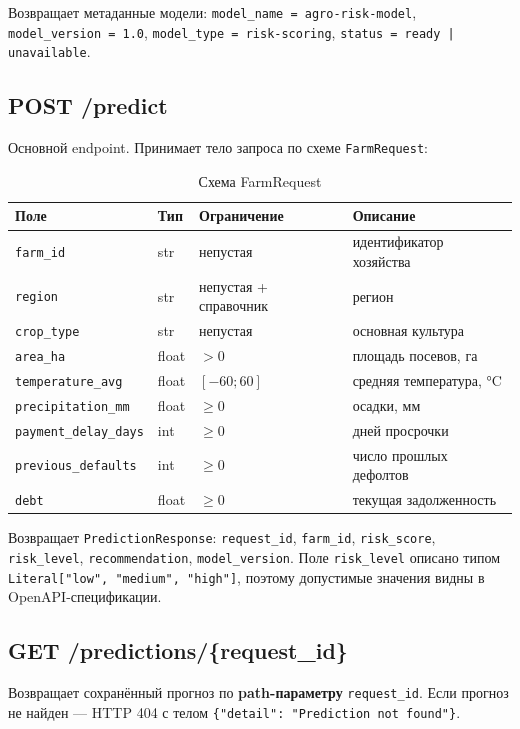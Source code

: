 \documentclass[12pt,a4paper]{article}
\begin{document}
Возвращает метаданные модели: \texttt{model\_name = agro-risk-model}, \texttt{model\_version = 1.0}, \texttt{model\_type = risk-scoring}, \texttt{status = ready | unavailable}.

\subsection{POST /predict}

Основной endpoint. Принимает тело запроса по схеме \texttt{FarmRequest}:

\begin{table}[H]
\centering
\caption{Схема FarmRequest}
\begin{tabular}{|l|l|l|l|}
\hline
\textbf{Поле} & \textbf{Тип} & \textbf{Ограничение} & \textbf{Описание} \\
\hline
\texttt{farm\_id} & str & непустая & идентификатор хозяйства \\
\texttt{region} & str & непустая + справочник & регион \\
\texttt{crop\_type} & str & непустая & основная культура \\
\texttt{area\_ha} & float & $> 0$ & площадь посевов, га \\
\texttt{temperature\_avg} & float & $[-60; 60]$ & средняя температура, °C \\
\texttt{precipitation\_mm} & float & $\ge 0$ & осадки, мм \\
\texttt{payment\_delay\_days} & int & $\ge 0$ & дней просрочки \\
\texttt{previous\_defaults} & int & $\ge 0$ & число прошлых дефолтов \\
\texttt{debt} & float & $\ge 0$ & текущая задолженность \\
\hline
\end{tabular}
\end{table}

Возвращает \texttt{PredictionResponse}: \texttt{request\_id}, \texttt{farm\_id}, \texttt{risk\_score}, \texttt{risk\_level}, \texttt{recommendation}, \texttt{model\_version}. Поле \texttt{risk\_level} описано типом \verb|Literal["low", "medium", "high"]|, поэтому допустимые значения видны в OpenAPI-спецификации.

\subsection{GET /predictions/\{request\_id\}}

Возвращает сохранённый прогноз по \textbf{path-параметру} \texttt{request\_id}. Если прогноз не найден --- HTTP 404 с телом \verb|{"detail": "Prediction not found"}|.
\end{document}
